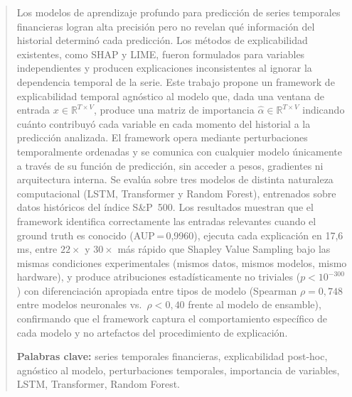 \documentclass[conference, letterpaper]{IEEEtran}
\begin{document}




\maketitle



\begin{abstract}
Los modelos de aprendizaje profundo para predicción de series 
temporales financieras logran alta precisión pero no revelan 
qué información del historial determinó cada predicción. Los 
métodos de explicabilidad existentes, como SHAP y LIME, fueron 
formulados para variables independientes y producen explicaciones 
inconsistentes al ignorar la dependencia temporal de la serie. 
Este trabajo propone un framework de explicabilidad temporal 
agnóstico al modelo que, dada una ventana de entrada 
$x \in \mathbb{R}^{T \times V}$, produce una matriz de importancia 
$\hat{\alpha} \in \mathbb{R}^{T \times V}$ indicando cuánto 
contribuyó cada variable en cada momento del historial a la 
predicción analizada. El framework opera mediante perturbaciones 
temporalmente ordenadas y se comunica con cualquier modelo 
únicamente a través de su función de predicción, sin acceder a 
pesos, gradientes ni arquitectura interna. Se evalúa sobre tres 
modelos de distinta naturaleza computacional (LSTM, Transformer
y Random Forest), entrenados sobre datos históricos del índice
S\&P~500. Los resultados muestran que el framework identifica correctamente
las entradas relevantes cuando el ground truth es conocido
(AUP\,=\,0{,}9960), ejecuta cada explicación en 17{,}6\,ms,
entre $22{\times}$ y $30{\times}$ más rápido que Shapley Value
Sampling bajo las mismas condiciones experimentales (mismos datos,
mismos modelos, mismo hardware),
y produce atribuciones estadísticamente no triviales
($p < 10^{-300}$) con diferenciación apropiada entre tipos de
modelo (Spearman $\rho = 0{,}748$ entre modelos neuronales vs.\
$\rho < 0{,}40$ frente al modelo de ensamble), confirmando que
el framework captura el comportamiento específico de cada modelo
y no artefactos del procedimiento de explicación.


\noindent \textbf{Palabras clave:} series temporales financieras, 
explicabilidad post-hoc, agnóstico al modelo, perturbaciones 
temporales, importancia de variables, LSTM, Transformer, 
Random Forest.
\end{abstract}
\end{document}
